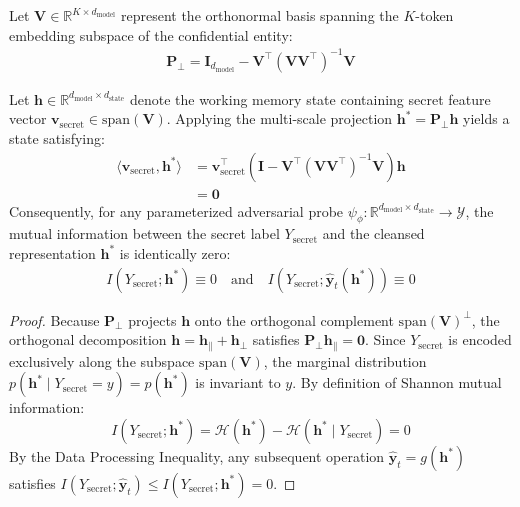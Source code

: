 Let $\mathbf{V} \in \mathbb{R}^{K \times d_{\mathrm{model}}}$ represent the orthonormal basis spanning the $K$-token embedding subspace of the confidential entity:
\begin{equation}
\begin{split}
    \mathbf{P}_{\perp} = \mathbf{I}_{d_{\mathrm{model}}} - \mathbf{V}^\top (\mathbf{V} \mathbf{V}^\top)^{-1} \mathbf{V}
\end{split}
\end{equation}

\begin{theorem}
\label{thm:zero_leakage}
Let $\mathbf{h} \in \mathbb{R}^{d_{\mathrm{model}} \times d_{\mathrm{state}}}$ denote the working memory state containing secret feature vector $\mathbf{v}_{\mathrm{secret}} \in \mathrm{span}(\mathbf{V})$. Applying the multi-scale projection $\mathbf{h}^* = \mathbf{P}_{\perp} \mathbf{h}$ yields a state satisfying:
\begin{equation}
\begin{split}
    \langle \mathbf{v}_{\mathrm{secret}}, \mathbf{h}^* \rangle &= \mathbf{v}_{\mathrm{secret}}^\top \left( \mathbf{I} - \mathbf{V}^\top (\mathbf{V}\mathbf{V}^\top)^{-1}\mathbf{V} \right) \mathbf{h} \\
    &= \mathbf{0}
\end{split}
\end{equation}
Consequently, for any parameterized adversarial probe $\psi_\phi: \mathbb{R}^{d_{\mathrm{model}} \times d_{\mathrm{state}}} \rightarrow \mathcal{Y}$, the mutual information between the secret label $Y_{\mathrm{secret}}$ and the cleansed representation $\mathbf{h}^*$ is identically zero:
\begin{equation}
\begin{split}
    I(Y_{\mathrm{secret}}; \mathbf{h}^*) \equiv 0 \quad \text{and} \quad I(Y_{\mathrm{secret}}; \hat{\mathbf{y}}_t(\mathbf{h}^*)) \equiv 0
\end{split}
\end{equation}
\end{theorem}

\begin{proof}
Because $\mathbf{P}_\perp$ projects $\mathbf{h}$ onto the orthogonal complement $\mathrm{span}(\mathbf{V})^\perp$, the orthogonal decomposition $\mathbf{h} = \mathbf{h}_{\parallel} + \mathbf{h}_{\perp}$ satisfies $\mathbf{P}_\perp \mathbf{h}_\parallel = \mathbf{0}$. Since $Y_{\mathrm{secret}}$ is encoded exclusively along the subspace $\mathrm{span}(\mathbf{V})$, the marginal distribution $p(\mathbf{h}^* \mid Y_{\mathrm{secret}} = y) = p(\mathbf{h}^*)$ is invariant to $y$. By definition of Shannon mutual information:
\begin{equation}
    I(Y_{\mathrm{secret}}; \mathbf{h}^*) = \mathcal{H}(\mathbf{h}^*) - \mathcal{H}(\mathbf{h}^* \mid Y_{\mathrm{secret}}) = 0
\end{equation}
By the Data Processing Inequality, any subsequent operation $\hat{\mathbf{y}}_t = g(\mathbf{h}^*)$ satisfies $I(Y_{\mathrm{secret}}; \hat{\mathbf{y}}_t) \le I(Y_{\mathrm{secret}}; \mathbf{h}^*) = 0$.
\end{proof}

